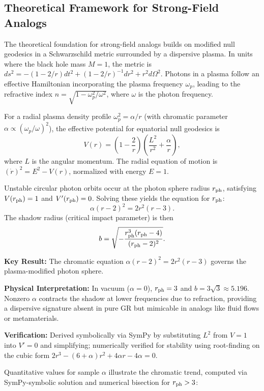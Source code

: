 \documentclass{article}
\begin{document}
\subsection{Theoretical Framework for Strong-Field Analogs}

The theoretical foundation for strong-field analogs builds on modified null geodesics in a Schwarzschild metric surrounded by a dispersive plasma. In units where the black hole mass $M=1$, the metric is $ds^2 = -(1 - 2/r) dt^2 + (1 - 2/r)^{-1} dr^2 + r^2 d\Omega^2$. Photons in a plasma follow an effective Hamiltonian incorporating the plasma frequency $\omega_p$, leading to the refractive index $n = \sqrt{1 - \omega_p^2 / \omega^2}$, where $\omega$ is the photon frequency.

For a radial plasma density profile $\omega_p^2 = \alpha / r$ (with chromatic parameter $\alpha \propto (\omega_p / \omega)^2$), the effective potential for equatorial null geodesics is
\[
V(r) = \left(1 - \frac{2}{r}\right) \left( \frac{L^2}{r^2} + \frac{\alpha}{r} \right),
\]
where $L$ is the angular momentum. The radial equation of motion is $(\dot{r})^2 = E^2 - V(r)$, normalized with energy $E=1$.

Unstable circular photon orbits occur at the photon sphere radius $r_{\rm ph}$, satisfying $V(r_{\rm ph}) = 1$ and $V'(r_{\rm ph}) = 0$. Solving these yields the equation for $r_{\rm ph}$:
\[
\alpha (r - 2)^2 = 2 r^2 (r - 3).
\]
The shadow radius (critical impact parameter) is then
\[
b = \sqrt{ -\frac{r_{\rm ph}^3 (r_{\rm ph} - 4)}{(r_{\rm ph} - 2)^2} }.
\]

\begin{framed}
\textbf{Key Result:} The chromatic equation $\alpha (r - 2)^2 = 2 r^2 (r - 3)$ governs the plasma-modified photon sphere.

\textbf{Physical Interpretation:} In vacuum ($\alpha=0$), $r_{\rm ph}=3$ and $b=3\sqrt{3} \approx 5.196$. Nonzero $\alpha$ contracts the shadow at lower frequencies due to refraction, providing a dispersive signature absent in pure GR but mimicable in analogs like fluid flows or metamaterials.

\textbf{Verification:} Derived symbolically via SymPy by substituting $L^2$ from $V=1$ into $V'=0$ and simplifying; numerically verified for stability using root-finding on the cubic form $2 r^3 - (6 + \alpha) r^2 + 4 \alpha r - 4 \alpha = 0$.
\end{framed}

Quantitative values for sample $\alpha$ illustrate the chromatic trend, computed via SymPy-symbolic solution and numerical bisection for $r_{\rm ph} > 3$:
\end{document}
